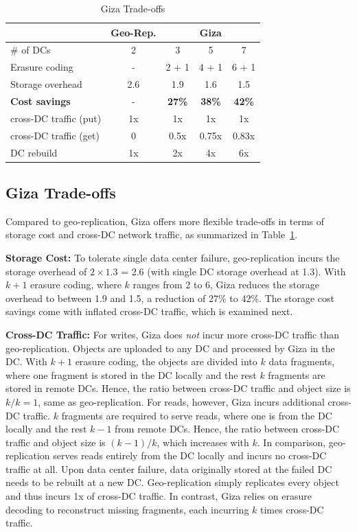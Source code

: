 \begin{table}[tp]
\centering
\footnotesize
\begin{tabular}{|l||c||c|c|c|}
\hline
											& Geo-Rep.						& \multicolumn{3}{c|}{Giza}
\\ \hline \hline
\# of DCs 						& 2										& 3 		& 5 		& 7
\\ \hline
Erasure coding 				& -										& 2 + 1	& 4 + 1	& 6 + 1
\\ \hline \hline
Storage overhead			& 2.6									& 1.9 	& 1.6 	& 1.5
\\ \hline
{\bf Cost savings}		& -										& {\bf 27\%} 	& {\bf 38\%} 	& {\bf 42\%}
\\ \hline \hline
cross-DC traffic (put)& 1x									& 1x 		& 1x 		& 1x
\\ \hline
cross-DC traffic (get)& 0										& 0.5x 	& 0.75x & 0.83x
\\ \hline
DC rebuild 						& 1x									& 2x 		& 4x 		& 6x
\\ \hline \hline
\end{tabular}
\caption{Giza Trade-offs}
\label{tab:cost_benefit}
\end{table}


\subsection{Giza Trade-offs}
\label{sec:alternative}

Compared to geo-replication, Giza offers more flexible trade-offs in terms of storage cost and cross-DC network traffic,
as summarized in Table~\ref{tab:cost_benefit}.

{\bf Storage Cost:}
To tolerate single data center failure, geo-replication incurs the storage overhead of $2\times1.3$ = 2.6 (with single DC storage overhead at 1.3).
With $k+1$ erasure coding, where $k$ ranges from 2 to 6, Giza reduces the storage overhead to between 1.9 and 1.5, a reduction of 27\% to 42\%.
The storage cost savings come with inflated cross-DC traffic, which is examined next.

{\bf Cross-DC Traffic:} For writes, Giza does {\em not} incur more cross-DC traffic than geo-replication. Objects are uploaded to any DC and processed by Giza in the DC. With $k+1$ erasure coding, the objects are divided into $k$ data fragments, where one fragment is stored in the DC locally and the rest $k$ fragments are stored in remote DCs. Hence, the ratio between cross-DC traffic and object size is $k/k = 1$, same as geo-replication.
For reads, however, Giza incurs additional cross-DC traffic. $k$ fragments are required to serve reads, where one is from the DC locally and the rest $k-1$ from remote DCs. Hence, the ratio between cross-DC traffic and object size is $(k-1)/k$, which increases with $k$. In comparison, geo-replication serves reads entirely from the DC locally and incurs no cross-DC traffic at all.
Upon data center failure, data originally stored at the failed DC needs to be rebuilt at a new DC. Geo-replication simply replicates every object and thus incurs 1x of cross-DC traffic. In contrast, Giza relies on erasure decoding to reconstruct missing fragments, each incurring $k$ times cross-DC traffic.

